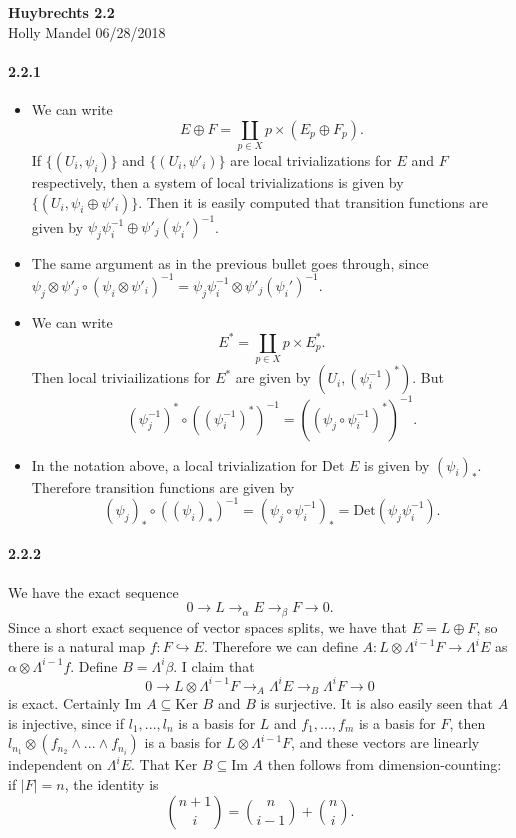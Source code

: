 \documentclass[10pt,letter]{article}
\begin{document}
\begin{center} 
{\bf Huybrechts 2.2} \\
Holly Mandel 06/28/2018
\end{center}
\paragraph*{2.2.1}
\begin{itemize}
\item We can write \[ E \oplus F = \coprod_{p \in X} p \times ( E_p \oplus F_p).\] If $\lbrace (U_i, \psi_i) \rbrace$ and $\lbrace (U_i, \psi'_i) \rbrace$ are local trivializations for $E$ and $F$ respectively, then a system of local trivializations is given by $\lbrace (U_i,\psi_i \oplus \psi'_i) \rbrace$. Then it is easily computed that transition functions are given by $\psi_j \psi_i^{-1} \oplus \psi'_j (\psi_i')^{-1}$. 
\item The same argument as in the previous bullet goes through, since $\psi_j \otimes \psi'_j \circ (\psi_i \otimes \psi'_i)^{-1} = \psi_j \psi_i^{-1} \otimes \psi'_j (\psi_i')^{-1}$. 
\item We can write \[ E^{\ast} = \coprod_{p \in X} p \times E_p^{\ast}.\] Then local triviailizations for $E^{\ast}$ are given by $(U_i, (\psi_i^{-1})^{\ast})$. But \[ (\psi_j^{-1})^{\ast} \circ ((\psi_i^{-1})^{\ast})^{-1} = ((\psi_j \circ \psi_i^{-1})^{\ast})^{-1}.\] 
\item In the notation above, a local trivialization for $\text{Det } E$ is given by $(\psi_i)_{\ast}$. Therefore transition functions are given by \[ (\psi_j)_{\ast} \circ ((\psi_i)_{\ast})^{-1} = (\psi_j \circ \psi_i^{-1})_{\ast} = \text{Det}(\psi_j \psi_i^{-1}).\] 
\end{itemize}

\paragraph*{2.2.2} We have the exact sequence \[ 0 \rightarrow L \rightarrow_{\alpha} E \rightarrow_{\beta} F \rightarrow 0.\] Since a short exact sequence of vector spaces splits, we have that $E = L \oplus F$, so there is a natural map $f: F \hookrightarrow E$. Therefore we can define $A: L \otimes \Lambda^{i-1}F \rightarrow \Lambda^i E$ as $\alpha \otimes \Lambda^{i-1} f$. Define $B = \Lambda^i \beta$. I claim that
 \[ 0 \rightarrow L \otimes \Lambda^{i-1}F \rightarrow_{A} \Lambda^{i} E \rightarrow_{B} \Lambda^i F \rightarrow 0\] is exact. Certainly $\text{Im }A \subseteq \text{Ker }B$ and $B$ is surjective. It is also easily seen that $A$ is injective, since if $l_1,...,l_n$ is a basis for $L$ and $f_1,...,f_m$ is a basis for $F$, then $l_{n_1} \otimes (f_{n_2} \wedge ... \wedge f_{n_i})$ is a basis for $L \otimes \Lambda^{i-1}F$, and these vectors are linearly independent on $\Lambda^i E$. That $\text{Ker }B \subseteq \text{Im }A$ then follows from dimension-counting: if $\vert F \vert = n$, the identity is
 \[ \binom{n+1}{i} = \binom{n}{i-1} + \binom{n}{i}.\] 
\end{document}
